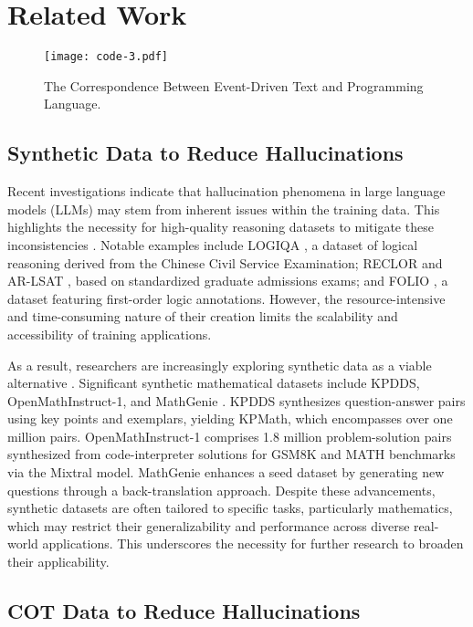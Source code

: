 \section{Related Work}
\begin{figure}[t]
    \texttt{[image: code-3.pdf]}
    \centering
    \caption{The Correspondence Between Event-Driven 
Text and Programming Language.}
    \label{fig:compare}
    \end{figure}


\subsection{Synthetic Data to Reduce Hallucinations}

Recent investigations indicate that hallucination phenomena in large language models (LLMs) may stem from inherent issues within the training data. This highlights the necessity for high-quality reasoning datasets to mitigate these inconsistencies \cite{zhang2023siren,jiang2024survey}. Notable examples include LOGIQA \cite{liu2023logiqa}, a dataset of logical reasoning derived from the Chinese Civil Service Examination; RECLOR \cite{yureclor} and AR-LSAT \cite{zhong2021ar}, based on standardized graduate admissions exams; and FOLIO \cite{han2022folio}, a dataset featuring first-order logic annotations. However, the resource-intensive and time-consuming nature of their creation limits the scalability and accessibility of training applications.

As a result, researchers are increasingly exploring synthetic data as a viable alternative \cite{achiam2023gpt,dubey2024llama}. Significant synthetic mathematical datasets include KPDDS, OpenMathInstruct-1, and MathGenie \cite{toshniwal2024openmathinstruct,huang2024key,lu2024mathgenie}. KPDDS synthesizes question-answer pairs using key points and exemplars, yielding KPMath, which encompasses over one million pairs. OpenMathInstruct-1 comprises 1.8 million problem-solution pairs synthesized from code-interpreter solutions for GSM8K and MATH benchmarks via the Mixtral model. MathGenie enhances a seed dataset by generating new questions through a back-translation approach. Despite these advancements, synthetic datasets are often tailored to specific tasks, particularly mathematics, which may restrict their generalizability and performance across diverse real-world applications. This underscores the necessity for further research to broaden their applicability.

    
\subsection{COT Data to Reduce Hallucinations}



